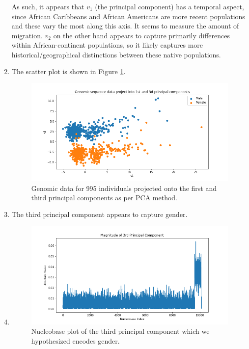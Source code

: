 \documentclass[12pt]{article}
\begin{document}
\begin{enumerate}[label=(\alph*)]
    As such, it appears that $v_1$ (the principal component) has a temporal aspect, since African Caribbeans and African Americans are more recent populations and these vary the most along this axis. It seems to measure the amount of migration. $v_2$ on the other hand appears to capture primarily differences within African-continent populations, so it likely captures more historical/geographical distinctions between these native populations.
  \item
    The scatter plot is shown in Figure \ref{fig:pca_genomic_projection_2}.
    \begin{figure}[!ht]
      \centering
      \includegraphics[scale=0.5]{figures/genomic_2d_projection_2.png}
      \caption{Genomic data for 995 individuals projected onto the first and third principal components as per PCA method.}
      \label{fig:pca_genomic_projection_2}
    \end{figure}

  \item
    The third principal component appears to capture gender. 

  \item
    \begin{figure}[!ht]
      \centering
      \includegraphics[scale=0.5]{figures/x_y_chromosomes.png}
      \caption{Nucleobase plot of the third principal component which we hypothesized encodes gender.}
      \label{fig:gender_nucleobase}
    \end{figure}
    

\end{enumerate}
\end{document}
